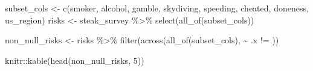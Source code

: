 \documentclass[
]{article}
\newenvironment{Shaded}{\begin{snugshade}}{\end{snugshade}}
\newcommand{\DecValTok}[1]{\textcolor[rgb]{0.00,0.00,0.81}{#1}}
\newcommand{\FunctionTok}[1]{\textcolor[rgb]{0.00,0.00,0.00}{#1}}
\newcommand{\NormalTok}[1]{#1}
\newcommand{\OtherTok}[1]{\textcolor[rgb]{0.56,0.35,0.01}{#1}}
\newcommand{\SpecialCharTok}[1]{\textcolor[rgb]{0.00,0.00,0.00}{#1}}
\newcommand{\StringTok}[1]{\textcolor[rgb]{0.31,0.60,0.02}{#1}}
\begin{document}
\begin{Shaded}
\begin{Highlighting}[]
\NormalTok{subset\_cols }\OtherTok{\textless{}{-}} \FunctionTok{c}\NormalTok{(}\StringTok{\textquotesingle{}smoker\textquotesingle{}}\NormalTok{, }\StringTok{\textquotesingle{}alcohol\textquotesingle{}}\NormalTok{, }\StringTok{\textquotesingle{}gamble\textquotesingle{}}\NormalTok{, }\StringTok{\textquotesingle{}skydiving\textquotesingle{}}\NormalTok{, }\StringTok{\textquotesingle{}speeding\textquotesingle{}}\NormalTok{, }\StringTok{\textquotesingle{}cheated\textquotesingle{}}\NormalTok{, }\StringTok{\textquotesingle{}doneness\textquotesingle{}}\NormalTok{, }\StringTok{\textquotesingle{}us\_region\textquotesingle{}}\NormalTok{)}
\NormalTok{risks }\OtherTok{\textless{}{-}}\NormalTok{ steak\_survey }\SpecialCharTok{\%\textgreater{}\%} 
  \FunctionTok{select}\NormalTok{(}\FunctionTok{all\_of}\NormalTok{(subset\_cols))}
\end{Highlighting}
\end{Shaded}

\begin{Shaded}
\begin{Highlighting}[]
\NormalTok{non\_null\_risks }\OtherTok{\textless{}{-}}\NormalTok{ risks }\SpecialCharTok{\%\textgreater{}\%} 
  \FunctionTok{filter}\NormalTok{(}\FunctionTok{across}\NormalTok{(}\FunctionTok{all\_of}\NormalTok{(subset\_cols), }\SpecialCharTok{\textasciitilde{}}\NormalTok{ .x }\SpecialCharTok{!=} \StringTok{\textquotesingle{}\textquotesingle{}}\NormalTok{))}

\NormalTok{knitr}\SpecialCharTok{::}\FunctionTok{kable}\NormalTok{(}\FunctionTok{head}\NormalTok{(non\_null\_risks, }\DecValTok{5}\NormalTok{))}
\end{Highlighting}
\end{Shaded}
\end{document}
